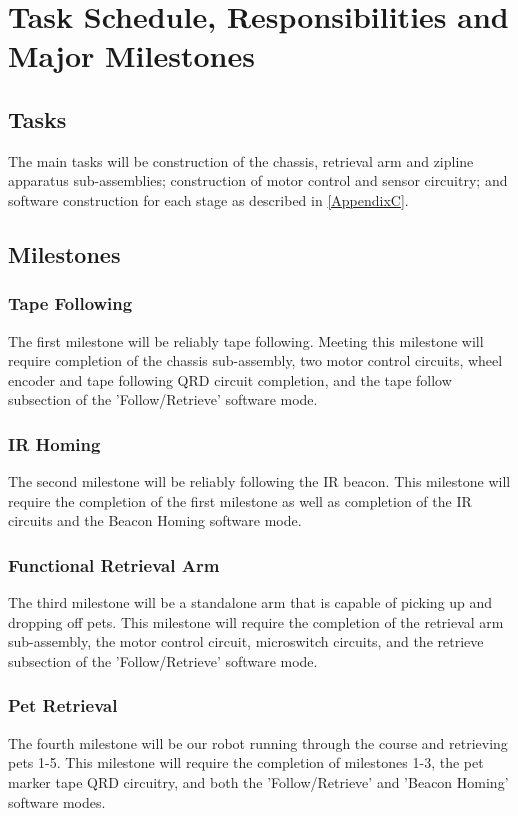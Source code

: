\documentclass[11pt, oneside]{article} %
\begin{document}
\section{Task Schedule, Responsibilities and Major Milestones}

	\subsection{Tasks} 
	The main tasks will be construction of the chassis, retrieval arm and zipline apparatus sub-assemblies; construction of motor control and sensor circuitry; and software construction for each stage as described in \autoref{AppendixC}.

	\subsection{Milestones}
		\subsubsection{Tape Following}
		The first milestone will be reliably tape following. Meeting this milestone will require completion of the chassis sub-assembly, two motor control circuits, wheel encoder and tape following QRD circuit completion, and the tape follow subsection of the 'Follow/Retrieve' software mode.
		\subsubsection{IR Homing}
		The second milestone will be reliably following the IR beacon.  This milestone will require the completion of the first milestone as well as completion of the IR circuits and the Beacon Homing software mode.
		\subsubsection{Functional Retrieval Arm}
		The third milestone will be a standalone arm that is capable of picking up and dropping off pets. This milestone will require the completion of the retrieval arm sub-assembly, the motor control circuit, microswitch circuits, and the retrieve subsection of the 'Follow/Retrieve' software mode.
		\subsubsection{Pet Retrieval}
		The fourth milestone will be our robot running through the course and retrieving pets 1-5. This milestone will require the completion of milestones 1-3, the pet marker tape QRD circuitry, and both the 'Follow/Retrieve' and 'Beacon Homing' software modes.
\end{document}
